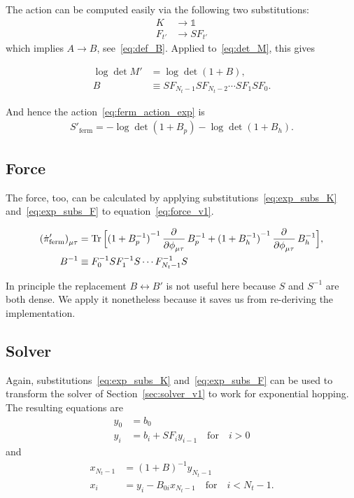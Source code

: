 \documentclass[a4paper, fleqn, twoside, notitlepage]{scrartcl}
\begin{document}
The action can be computed easily via the following two substitutions:
\begin{align}
  K &\rightarrow \mathds{1}\label{eq:exp_subs_K}\\
  F_{t'} &\rightarrow S F_{t'}\label{eq:exp_subs_F}
\end{align}
which implies $A \rightarrow B$, see~\eqref{eq:def_B}.
Applied to~\eqref{eq:det_M}, this gives
\begin{resultbox}
  \vspace{-\baselineskip}
  \begin{align}
    \log \det M' &= \log \det (1 + B),\label{eq:det_M_exp}\\
    B &\equiv SF_{N_t-1} S F_{N_t-2} \cdots SF_{1} SF_{0}.\label{eq:def_B}
  \end{align}
\end{resultbox}
And hence the action~\eqref{eq:ferm_action_exp} is
\begin{align}
  S'_\text{ferm} = - \log \det (1 + B_p) - \log \det (1 + B_h).
\end{align}

\subsection{Force}

The force, too, can be calculated by applying substitutions~\eqref{eq:exp_subs_K} and~\eqref{eq:exp_subs_F} to equation~\eqref{eq:force_v1}.
\begin{resultbox}
  \vspace{-\baselineskip}
  \begin{align}
    {(\dot{\pi}'_{\text{ferm}})}_{\mu\tau} &= \Tr \Big[{(1+B_p^{-1})}^{-1}\dpd{}{\phi_{\mu\tau}}B_p^{-1} + {(1+B_h^{-1})}^{-1}\dpd{}{\phi_{\mu\tau}}B_h^{-1}\Big],\\
    B^{-1} &\equiv F_0^{-1}S F_1^{-1}S \cdots F_{N_t-1}^{-1}S
  \end{align}
\end{resultbox}
\noindent
In principle the replacement $B \leftrightarrow B'$ is not useful here because $S$ and $S^{-1}$ are both dense. We apply it nonetheless because it saves us from re-deriving the implementation.

\subsection{Solver}

Again, substitutions~\eqref{eq:exp_subs_K} and~\eqref{eq:exp_subs_F} can be used to transform the solver of Section~\ref{sec:solver_v1} to work for exponential hopping.
The resulting equations are
\begin{align}
  y_0 &= b_0\\
  y_i &= b_i + S F_i y_{i-1} \quad \text{for} \quad i > 0
\end{align}
and
\begin{align}
  x_{N_t-1} &= {(1+B)}^{-1} y_{N_t-1}\\
  x_i &= y_i - B_{0i}x_{N_t-1} \quad \text{for} \quad i < N_t-1.
\end{align}

\clearpage


\end{document}
